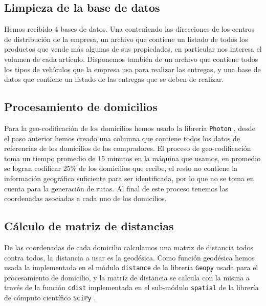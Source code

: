 \documentclass[journal]{IEEEtran}
\begin{document}
        \subsection{Limpieza de la base de datos} \label{stage 1}
            
            Hemos recibido 4 bases de datos. Una conteniendo las direcciones de los centros de distribución de la empresa, un archivo que contiene un listado de todos los productos que vende más algunas de sus propiedades, en particular nos interesa el volumen de cada artículo. Disponemos también de un archivo que contiene todos los tipos de vehículos que la empresa usa para realizar las entregas, y una base de datos que contiene un listado de las entregas que se deben de realizar.
            
        \subsection{Procesamiento de domicilios} \label{stage 2}
        
            Para la geo-codificación de los domicilios hemos usado la librería \texttt{Photon} \cite{photon}, desde el paso anterior hemos creado una columna que contiene todos los datos de referencias de los domicilios de los compradores. El proceso de geo-codificación toma un tiempo promedio de 15 minutos en la máquina que usamos, en promedio se logran codificar 25\% de los domicilios que recibe, el resto no contiene la información geográfica suficiente para ser identificada, por lo que no se toma en cuenta para la generación de rutas. Al final de este proceso tenemos las coordenadas asociadas a cada uno de los domicilios.

        \subsection{Cálculo de matriz de distancias} \label{stage 3}
            
            De las coordenadas de cada domicilio calculamos una matriz de distancia todos contra todos, la distancia a usar es la geodésica. Como función geodésica hemos usada la implementada en el módulo \texttt{distance} de la librería \texttt{Geopy} \cite{geopy} usada para el procesamiento de domicilio, y la matriz de distancia se calcula con la misma a través de la función \texttt{cdist} implementada en el sub-módulo \texttt{spatial} de la librería de cómputo científico \texttt{SciPy} \cite{2020SciPy-NMeth}.
\end{document}
